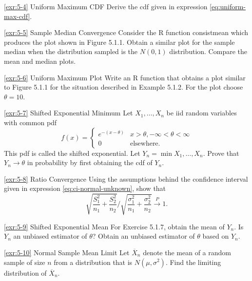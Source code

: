 \begin{exercise}{\ref{exr:5-4} Uniform Maximum CDF}\label{exr:5-4}
Derive the cdf given in expression \eqref{eq:uniform-max-cdf}.
\end{exercise}

\begin{exercise}{\ref{exr:5-5} Sample Median Convergence}\label{exr:5-5}
Consider the R function consistmean which produces the plot shown in Figure 5.1.1. Obtain a similar plot for the sample median when the distribution sampled is the $N(0,1)$ distribution. Compare the mean and median plots.
\end{exercise}

\begin{exercise}{\ref{exr:5-6} Uniform Maximum Plot}\label{exr:5-6}
Write an R function that obtains a plot similar to Figure 5.1.1 for the situation described in Example 5.1.2. For the plot choose $\theta = 10$.
\end{exercise}

\begin{exercise}{\ref{exr:5-7} Shifted Exponential Minimum}\label{exr:5-7}
Let $X_1, \ldots, X_n$ be iid random variables with common pdf
\[
f(x) = \begin{cases}
e^{-(x-\theta)} & x > \theta, -\infty < \theta < \infty \\
0 & \text{elsewhere}.
\end{cases}
\label{eq:shifted-exponential}
\]
This pdf is called the shifted exponential. Let $Y_n = \min{X_1, \ldots, X_n}$. Prove that $Y_n \to \theta$ in probability by first obtaining the cdf of $Y_n$.
\end{exercise}

\begin{exercise}{\ref{exr:5-8} Ratio Convergence}\label{exr:5-8}
Using the assumptions behind the confidence interval given in expression \eqref{eq:ci-normal-unknown}, show that
\[
\sqrt{\frac{S_1^2}{n_1} + \frac{S_2^2}{n_2}} \Big/ \sqrt{\frac{\sigma_1^2}{n_1} + \frac{\sigma_2^2}{n_2}} \xrightarrow{P} 1.
\]
\end{exercise}

\begin{exercise}{\ref{exr:5-9} Shifted Exponential Mean}\label{exr:5-9}
For Exercise 5.1.7, obtain the mean of $Y_n$. Is $Y_n$ an unbiased estimator of $\theta$? Obtain an unbiased estimator of $\theta$ based on $Y_n$.
\end{exercise}

\begin{exercise}{\ref{exr:5-10} Normal Sample Mean Limit}\label{exr:5-10}
Let $\overline{X}_n$ denote the mean of a random sample of size $n$ from a distribution that is $N(\mu, \sigma^2)$. Find the limiting distribution of $\overline{X}_n$.
\end{exercise}

